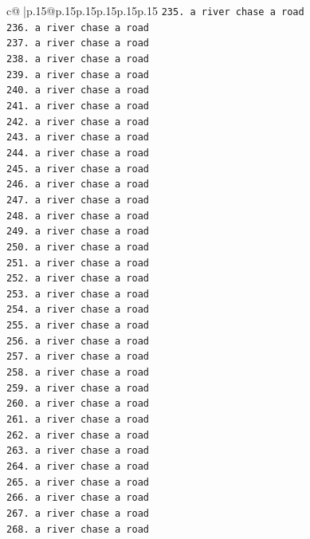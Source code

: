 \documentclass{article}
\begin{document}
{\begin{supertabular}{c@{$\;$}|p{.15\linewidth}@{}p{.15\linewidth}p{.15\linewidth}p{.15\linewidth}p{.15\linewidth}p{.15\linewidth}}
{{{\texttt{235. a river chase a road} \\
\texttt{236. a river chase a road} \\
\texttt{237. a river chase a road} \\
\texttt{238. a river chase a road} \\
\texttt{239. a river chase a road} \\
\texttt{240. a river chase a road} \\
\texttt{241. a river chase a road} \\
\texttt{242. a river chase a road} \\
\texttt{243. a river chase a road} \\
\texttt{244. a river chase a road} \\
\texttt{245. a river chase a road} \\
\texttt{246. a river chase a road} \\
\texttt{247. a river chase a road} \\
\texttt{248. a river chase a road} \\
\texttt{249. a river chase a road} \\
\texttt{250. a river chase a road} \\
\texttt{251. a river chase a road} \\
\texttt{252. a river chase a road} \\
\texttt{253. a river chase a road} \\
\texttt{254. a river chase a road} \\
\texttt{255. a river chase a road} \\
\texttt{256. a river chase a road} \\
\texttt{257. a river chase a road} \\
\texttt{258. a river chase a road} \\
\texttt{259. a river chase a road} \\
\texttt{260. a river chase a road} \\
\texttt{261. a river chase a road} \\
\texttt{262. a river chase a road} \\
\texttt{263. a river chase a road} \\
\texttt{264. a river chase a road} \\
\texttt{265. a river chase a road} \\
\texttt{266. a river chase a road} \\
\texttt{267. a river chase a road} \\
\texttt{268. a river chase a road} \\
}}}
\end{supertabular}}
\end{document}
